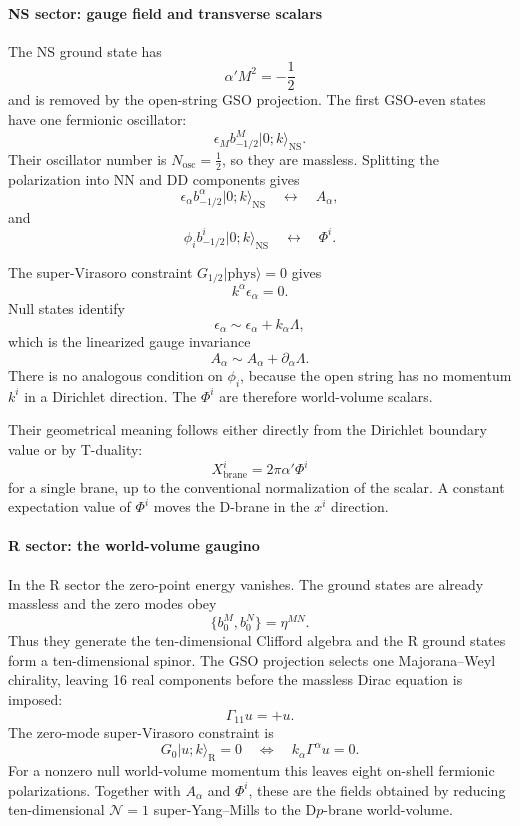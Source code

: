\documentclass[
  10pt,
  a4paper,
  openany]{book}
\begin{document}
\paragraph{NS sector: gauge field and transverse
scalars}\label{ns-sector-gauge-field-and-transverse-scalars}

The NS ground state has \[
\alpha'M^2=-\frac12
\] and is removed by the open-string GSO projection. The first GSO-even
states have one fermionic oscillator: \[
\epsilon_M b_{-1/2}^M|0;k\rangle_{\mathrm{NS}}.
\] Their oscillator number is \(N_{\mathrm{osc}}=\frac12\), so they are
massless. Splitting the polarization into NN and DD components gives \[
\epsilon_\alpha b_{-1/2}^\alpha|0;k\rangle_{\mathrm{NS}}
\quad\longleftrightarrow\quad
A_\alpha,
\] and \[
\phi_i b_{-1/2}^i|0;k\rangle_{\mathrm{NS}}
\quad\longleftrightarrow\quad
\Phi^i.
\]

The super-Virasoro constraint \(G_{1/2}|\mathrm{phys}\rangle=0\) gives
\[
k^\alpha\epsilon_\alpha=0.
\] Null states identify \[
\epsilon_\alpha
\sim
\epsilon_\alpha+k_\alpha\Lambda,
\] which is the linearized gauge invariance \[
A_\alpha
\sim
A_\alpha+\partial_\alpha\Lambda.
\] There is no analogous condition on \(\phi_i\), because the open
string has no momentum \(k^i\) in a Dirichlet direction. The \(\Phi^i\)
are therefore world-volume scalars.

Their geometrical meaning follows either directly from the Dirichlet
boundary value or by T-duality: \[
\boxed{
X^i_{\mathrm{brane}}
=2\pi\alpha'\Phi^i
}
\] for a single brane, up to the conventional normalization of the
scalar. A constant expectation value of \(\Phi^i\) moves the D-brane in
the \(x^i\) direction.

\paragraph{R sector: the world-volume
gaugino}\label{r-sector-the-world-volume-gaugino}

In the R sector the zero-point energy vanishes. The ground states are
already massless and the zero modes obey \[
\{b_0^M,b_0^N\}
=\eta^{MN}.
\] Thus they generate the ten-dimensional Clifford algebra and the R
ground states form a ten-dimensional spinor. The GSO projection selects
one Majorana--Weyl chirality, leaving 16 real components before the
massless Dirac equation is imposed: \[
\Gamma_{11}u=+u.
\] The zero-mode super-Virasoro constraint is \[
G_0|u;k\rangle_{\mathrm R}=0
\quad\Longleftrightarrow\quad
k_\alpha\Gamma^\alpha u=0.
\] For a nonzero null world-volume momentum this leaves eight on-shell
fermionic polarizations. Together with \(A_\alpha\) and \(\Phi^i\),
these are the fields obtained by reducing ten-dimensional
\(\mathcal N=1\) super-Yang--Mills to the D\(p\)-brane world-volume.
\end{document}
